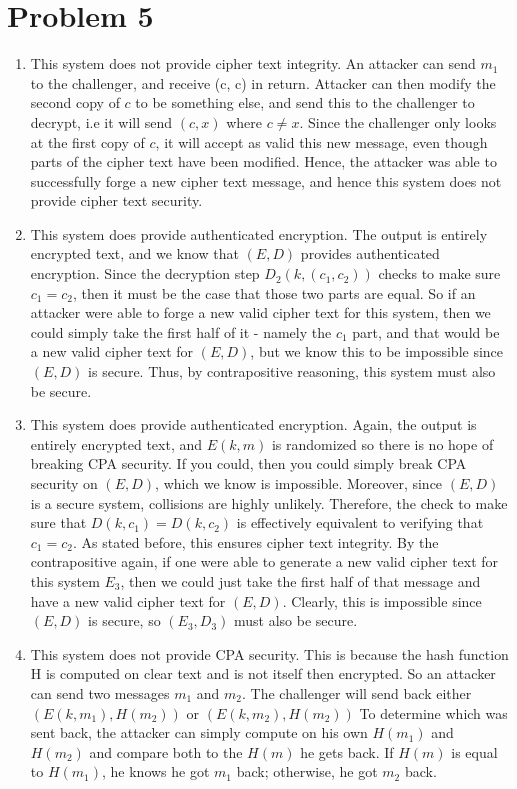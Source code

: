 \documentclass{article}
\begin{document}
\section*{Problem 5}
\begin{enumerate}
\item %
This system does not provide cipher text integrity. An attacker can send $m_1$ to the challenger, and receive (c, c) in return. Attacker can then modify the second copy of $c$ to be something else, and send this to the challenger to decrypt, i.e it will send $(c, x)$ where $c \neq x$. Since the challenger only looks at the first copy of $c$, it will accept as valid this new message, even though parts of the cipher text have been modified. Hence, the attacker was able to successfully forge a new cipher text message, and hence this system does not provide cipher text security.

\item %
This system does provide authenticated encryption. The output is entirely encrypted text, and we know that $(E, D)$ provides authenticated encryption. Since the decryption step $D_2 (k, (c_1, c_2))$ checks to make sure $c_1 = c_2$, then it must be the case that those two parts are equal. So if an attacker were able to forge a new valid cipher text for this system, then we could simply take the first half of it - namely the $c_1$ part, and that would be a new valid cipher text for $(E, D)$, but we know this to be impossible since $(E, D)$ is secure. Thus, by contrapositive reasoning, this system must also be secure.

\item %
This system does provide authenticated encryption. Again, the output is entirely encrypted text, and $E(k, m)$ is randomized so there is no hope of breaking CPA security. If you could, then you could simply break CPA security on $(E, D)$, which we know is impossible. Moreover, since $(E, D)$ is a secure system, collisions are highly unlikely. Therefore, the check to make sure that $D(k, c_1) = D(k, c_2)$ is effectively equivalent to verifying that $c_1 = c_2$. As stated before, this ensures cipher text integrity. By the contrapositive again, if one were able to generate a new valid cipher text for this system $E_3$, then we could just take the first half of that message and have a new valid cipher text for $(E, D)$. Clearly, this is impossible since $(E, D)$ is secure, so $(E_3, D_3)$ must also be secure.

\item %
This system does not provide CPA security. This is because the hash function H is computed on clear text and is not itself then encrypted. So an attacker can send two messages $m_1$ and $m_2$. The challenger will send back either $(E(k, m_1), H(m_2))$ 
or $(E(k, m_2), H(m_2))$ To determine which was sent back, the attacker can simply compute on his own $H(m_1)$ and $H(m_2)$ and compare both to the $H(m)$ he gets back. If $H(m)$ is equal to $H(m_1)$, he knows he got $m_1$ back; otherwise, he got $m_2$ back.

\end{enumerate}
\end{document}
